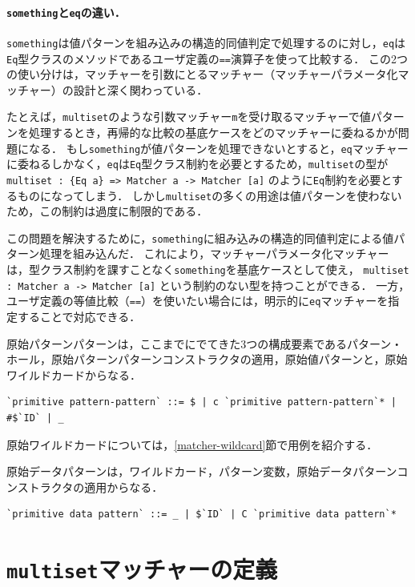 \paragraph{\texttt{something}と\texttt{eq}の違い．}
\lstinline{something}は値パターンを組み込みの構造的同値判定で処理するのに対し，\lstinline{eq}は\lstinline{Eq}型クラスのメソッドであるユーザ定義の\lstinline{==}演算子を使って比較する．
この2つの使い分けは，マッチャーを引数にとるマッチャー（マッチャーパラメータ化マッチャー）の設計と深く関わっている．

たとえば，\lstinline{multiset}のような引数マッチャー\lstinline{m}を受け取るマッチャーで値パターンを処理するとき，再帰的な比較の基底ケースをどのマッチャーに委ねるかが問題になる．
もし\lstinline{something}が値パターンを処理できないとすると，\lstinline{eq}マッチャーに委ねるしかなく，\lstinline{eq}は\lstinline{Eq}型クラス制約を必要とするため，\lstinline{multiset}の型が
\lstinline|multiset : {Eq a} => Matcher a -> Matcher [a]|
のように\lstinline{Eq}制約を必要とするものになってしまう．
しかし\lstinline{multiset}の多くの用途は値パターンを使わないため，この制約は過度に制限的である．

この問題を解決するために，\lstinline{something}に組み込みの構造的同値判定による値パターン処理を組み込んだ．
これにより，マッチャーパラメータ化マッチャーは，型クラス制約を課すことなく\lstinline{something}を基底ケースとして使え，
\lstinline|multiset : Matcher a -> Matcher [a]|
という制約のない型を持つことができる．
一方，ユーザ定義の等値比較（\lstinline{==}）を使いたい場合には，明示的に\lstinline{eq}マッチャーを指定することで対応できる．

原始パターンパターンは，ここまでにでてきた3つの構成要素であるパターン・ホール，原始パターンパターンコンストラクタの適用，原始値パターンと，原始ワイルドカードからなる．
\begin{lstlisting}[language=egison,numbers=none]
`primitive pattern-pattern` ::= $ | c `primitive pattern-pattern`* | #$`ID` | _
\end{lstlisting}
原始ワイルドカードについては，\ref{matcher-wildcard}節で用例を紹介する．

原始データパターンは，ワイルドカード，パターン変数，原始データパターンコンストラクタの適用からなる．
\begin{lstlisting}[language=egison,numbers=none]
`primitive data pattern` ::= _ | $`ID` | C `primitive data pattern`*
\end{lstlisting}

\section{\texttt{multiset}マッチャーの定義}\label{matcher-multiset}

